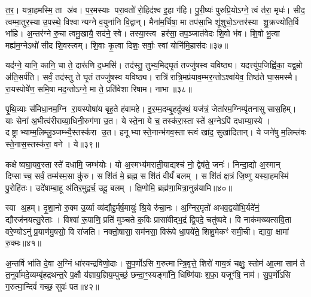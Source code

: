 त॒र॒। यत्रा॒हमस्मि॒ ता अ॑व। प॒र॒मस्याः परा॒वतो॑ रो॒हिद॑श्व इ॒हा ग॑हि। पु॒री॒ष्यः॑ पुरुप्रि॒योऽग्ने॒ त्वं त॑रा॒ मृधः॑। सीद॒ त्वम्मा॒तुर॒स्या उ॒पस्थे॒ विश्वान्यग्ने व॒युना॑नि वि॒द्वान्। मैना॑म॒र्चिषा॒ मा तप॑सा॒भि शू॑शुचो॒ऽन्तर॑स्या शु॒क्रज्यो॑ति॒र्वि भा॑हि। अ॒न्तर॑ग्ने रु॒चा त्वमु॒खायै॒ सद॑ने॒ स्वे। तस्या॒स्त्व हर॑सा॒ तप॒ञ्जात॑वेदः शि॒वो भ॑व। शि॒वो भू॒त्वा मह्य॑म॒ग्नेऽथो॑ सीद शि॒वस्त्वम्। शि॒वाः कृ॒त्वा दिशः॒ सर्वाः॒ स्वां योनि॑मि॒हास॑दः॥३७॥

{\anuvakamend[{वी॒रय॒स्वा तप॑न्विश॒तिश्च॑॥९॥}]}

यद॑ग्ने॒ यानि॒ कानि॒ चा ते॒ दारू॑णि द॒ध्मसि॑। तद॑स्तु॒ तुभ्य॒मिद्घृ॒तं तज्जु॑षस्व यविष्ठ्य। यदत्त्यु॑प॒जिह्वि॑का॒ यद्व॒म्रो अ॑ति॒सर्प॑ति। सर्वं॒ तद॑स्तु ते घृ॒तं तज्जु॑षस्व यविष्ठ्य। रात्रि॑रात्रि॒मप्र॑याव॒म्भर॒न्तोऽश्वा॑येव॒ तिष्ठ॑ते घा॒समस्मै। रा॒यस्पोषे॑ण॒ समि॒षा मद॒न्तोऽग्ने॒ मा ते॒ प्रति॑वेशा रिषाम। नाभा॥३८॥

पृ॒थि॒व्याः स॑मिधा॒नम॒ग्नि रा॒यस्पोषा॑य बृह॒ते ह॑वामहे। इ॒र॒म्म॒दम्बृ॒हदु॑क्थं॒ यज॑त्रं॒ जेता॑रम॒ग्निम्पृ॑तनासु सास॒हिम्। याः सेना॑ अ॒भीत्व॑रीराव्या॒धिनी॒रुग॑णा उ॒त। ये स्ते॒ना ये च॒ तस्क॑रा॒स्तास्ते॑ अ॒ग्नेऽपि॑ दधाम्या॒स्ये। दष्ट्राभ्याम्म॒लिम्लू॒ञ्जम्भ्यै॒स्तस्क॑रा उ॒त। हनूभ्यास्ते॒नान्भ॑गव॒स्तास्त्वं खा॑द॒ सुखा॑दितान्। ये जने॑षु म॒लिम्ल॑वः स्ते॒नास॒स्तस्क॑रा॒ वने। ये॥३९॥

कक्षेष्वघा॒यव॒स्तास्ते॑ दधामि॒ जम्भ॑योः। यो अ॒स्मभ्य॑मराती॒याद्यश्च॑ नो॒ द्वेष॑ते॒ जनः॑। निन्दा॒द्यो अ॒स्मान् दिप्साच्च॒ सर्वं॒ तम्म॑स्म॒सा कु॑रु। सशि॑तं मे॒ ब्रह्म॒ सशि॑तं वीर्यं॑ बलम्। सशि॑तं क्ष॒त्रं जि॒ष्णु यस्या॒हमस्मि॑ पु॒रोहि॑तः। उदे॑षाम्बा॒हू अ॑तिर॒मुद्वर्च॒ उदू॒ बलम्। क्षि॒णोमि॒ ब्रह्म॑णा॒मित्रा॒नुन्न॑यामि॥४०॥

स्वा अ॒हम्। दृ॒शा॒नो रु॒क्म उ॒र्व्या व्य॑द्यौद्दु॒र्मर्\mbox{}ष॒मायुः॑ श्रि॒ये रु॑चा॒नः। अ॒ग्निर॒मृतो॑ अभव॒द्वयो॑भि॒र्यदे॑नं॒ द्यौरज॑नयत्सु॒रेताः। विश्वा॑ रू॒पाणि॒ प्रति॑ मुञ्चते क॒विः प्रासा॑वीद्भ॒द्रं द्वि॒पदे॒ चतु॑ष्पदे। वि नाक॑मख्यत्सवि॒ता वरे॒ण्योऽनु॑ प्र॒याण॑मु॒षसो॒ वि रा॑जति। नक्तो॒षासा॒ सम॑नसा॒ विरू॑पे धा॒पये॑ते॒ शिशु॒मेकꣳ॑ समी॒ची। द्यावा॒ क्षामा॑ रु॒क्मः॥४१॥

अ॒न्तर्वि भा॑ति दे॒वा अ॒ग्निं धा॑रयन्द्रविणो॒दाः। सु॒प॒र्णोऽसि ग॒रुत्मान्त्रि॒वृत्ते॒ शिरो॑ गाय॒त्रं चक्षुः॒ स्तोम॑ आ॒त्मा साम॑ ते त॒नूर्वा॑मदे॒व्यम्बृ॑हद्रथन्त॒रे प॒क्षौ य॑ज्ञाय॒ज्ञिय॒म्पुच्छं॒ छन्दा॒ꣳ॒स्यङ्गा॑नि॒ धिष्णि॑याः श॒फा॒ यजूꣳ॑षि॒ नाम॑। सु॒प॒र्णो॑ऽसि ग॒रुत्मा॒न्दिवं॑ गच्छ॒ सुवः॑ पत॥४२॥

{\anuvakamend[{नाभा॒ वने॒ येन॑ यामि॒ ख्षामा॑ रु॒क्मोऽष्टात्रिꣳ॑शच्च॥10॥}]}

